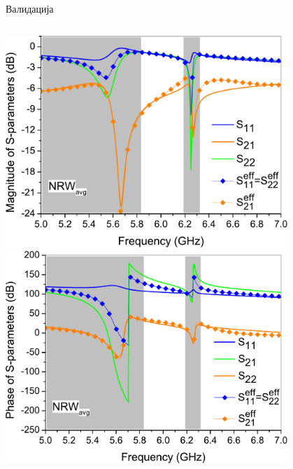 \documentclass{beamer}
\begin{document}
\begin{frame}[t]{Валидација}
\begin{columns}[c]
\includegraphics[width=0.80\textwidth]{slike/val90nrw_mag.pdf}
\includegraphics[width=0.80\textwidth]{slike/val90nrw_ang.pdf}



\end{columns}
\end{frame}
\end{document}
